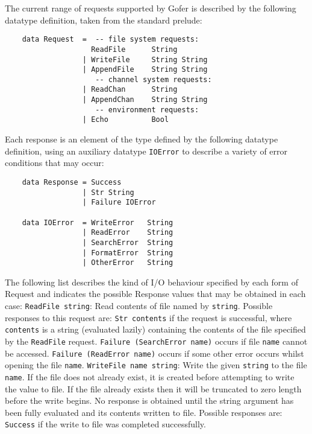 The current range of requests supported by Gofer is  described  by  the
following datatype definition, taken from the standard prelude:
\begin{verbatim}
    data Request  =  -- file system requests:
                    ReadFile      String         
                  | WriteFile     String String
                  | AppendFile    String String
                     -- channel system requests:
                  | ReadChan      String 
                  | AppendChan    String String
                     -- environment requests:
                  | Echo          Bool
\end{verbatim} 
Each response is an element  of  the  type  defined  by  the  following
datatype definition, using an auxiliary datatype \verb"IOError" to describe  a
variety of error conditions that may occur:
\begin{verbatim}
    data Response = Success
                  | Str String 
                  | Failure IOError
 
    data IOError  = WriteError   String
                  | ReadError    String
                  | SearchError  String
                  | FormatError  String
                  | OtherError   String
\end{verbatim}
The following list describes the kind of  I/O  behaviour  specified  by
each form of Request and indicates the possible  Response  values  that
may be obtained in each case:
\BI
\IT  \verb"ReadFile string":  Read  contents  of  file  named  by   
     \verb"string".
     Possible responses to this request are:
     \BI
     \IT  \verb"Str contents" if the request is successful, 
          where \verb"contents" is
          a string (evaluated lazily) containing the contents of the
          file specified by the \verb"ReadFile" request.
     \IT  \verb"Failure (SearchError name)" occurs if file  \verb"name"
          cannot  be
          accessed.
     \IT  \verb"Failure (ReadError name)" occurs if some  other  error  occurs
          whilst opening the file \verb"name".
     \EI
\IT  \verb"WriteFile name string":  Write  the  given  
     \verb"string"  to  the  file
     \verb"name".  If the file does not already exist, it is created  before
     attempting to write the value to file.  If the file already exists
     then it will be truncated to zero length before the write  begins.
     No response is obtained until the string argument has  been  fully
     evaluated and its contents written to  file.   Possible  responses
     are:
     \BI
     \IT  \verb"Success" if the write to file was completed successfully.
